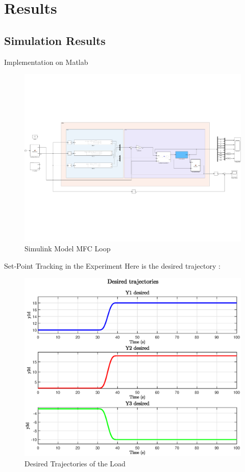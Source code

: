 \section{Results}
\subsection{Simulation Results}
\begin{frame}{Implementation on Matlab}
    \begin{figure}
        \centering
        \includegraphics[width=0.9\linewidth]{imgs/Simulation/MFC_efficient_model.pdf}
        \caption{Simulink Model MFC Loop}
        \label{fig:Simulink Model MFC Loop}
    \end{figure}
\end{frame}


\begin{frame}{Set‐Point Tracking in the Experiment}
    Here is the desired trajectory : 
    \begin{figure}
        \centering
        \includegraphics[width=0.75\linewidth]{imgs/Simulation/desiredTraj.eps}
        \caption{Desired Trajectories of the Load}
    \end{figure}
\end{frame}


